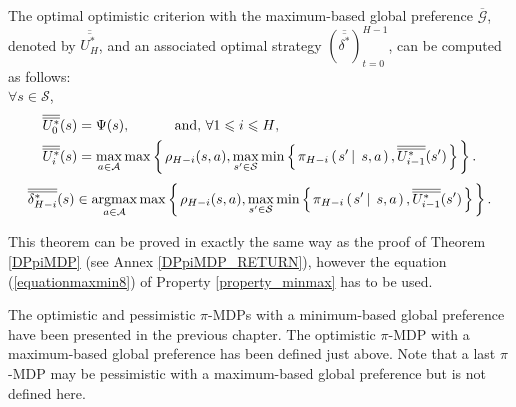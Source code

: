 \begin{theorem}
\label{theorem_optpiMDPglobalmax}
The optimal optimistic criterion with the maximum-based global preference $\overline{\mathcal{G}}$,
denoted by $\overline{\overline{U_H^*}}$, 
and an associated optimal strategy $(\overline{\overline{\delta^*}})_{t=0}^{H-1}$,
can be computed as follows:\\ 
$\forall s \in \mathcal{S}$,
\begin{align}
\nonumber 
\overline{\overline{U_0^*}}(s) & = \Psi(s), \mbox{\hspace{1cm} and, $\forall 1 \leqslant i \leqslant H$,} \\
\label{equation_recursiveoptmax} 
\overline{\overline{U_{i}^*}}(s)& = \max_{a \in \mathcal{A}} \max \left\{ \left.  \rho_{H-i}(s,a), \max_{s' \in \mathcal{S}} \min \left\{ \left.  \pi_{H-i} \left( \left.  s' \, \right| \left. \, s, a   \right. \right) , \overline{\overline{U^*_{i-1}}}(s')  \right. \right\}   \right. \right\}.
\end{align}
\begin{eqnarray}
\label{equation_recursiveoptstratmax} 
\overline{\overline{\delta^*_{H-i}}}(s) \in \operatorname*{argmax}_{a \in \mathcal{A}} \max \left\{ \left.  \rho_{H-i}(s,a), \max_{s' \in \mathcal{S}} \min \left\{ \left.  \pi_{H-i} \left( \left.  s' \, \right| \left. \, s, a   \right. \right) , \overline{\overline{U^*_{i-1}}}(s')  \right. \right\}   \right. \right\}.
\end{eqnarray}
\end{theorem}
This theorem can be proved in exactly the same way as the proof of Theorem \ref{DPpiMDP}
(see Annex \ref{DPpiMDP_RETURN}),
however the equation (\ref{equationmaxmin8}) of Property \ref{property_minmax} has to be used.

The optimistic and pessimistic $\pi$-MDPs with a minimum-based global preference
have been presented in the previous chapter.
The optimistic $\pi$-MDP with a maximum-based global preference has been defined just above.
Note that a last $\pi$-MDP may be pessimistic with a maximum-based global preference
but is not defined here.

